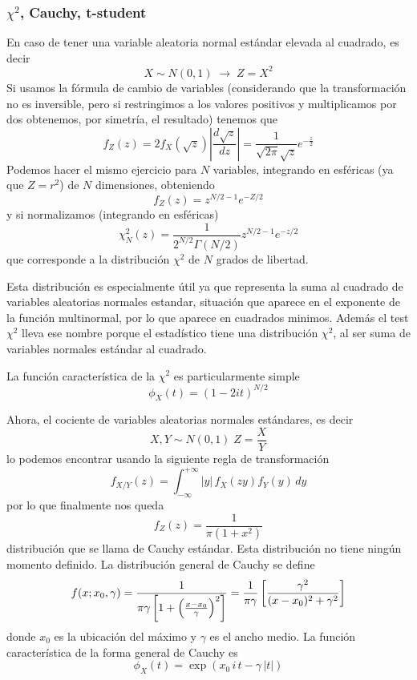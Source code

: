 \documentclass{article}
\numberwithin{equation}{section} %
\begin{document}
\subsubsection{$\chi^2$, Cauchy, t-student}
En caso de tener una variable aleatoria normal estándar elevada al cuadrado, es decir
\[ X \sim N(0,1) \; \rightarrow \; Z = X^2 \]
Si usamos la fórmula de cambio de variables (considerando que la transformación no es inversible, pero si restringimos a los valores positivos y multiplicamos por dos obtenemos, por simetría, el resultado) tenemos que
\[f_Z(z) = 2 f_X(\sqrt{z}) \left|\frac{d \sqrt{z}}{d z}\right| = \frac{1}{\sqrt{2\pi}\sqrt{z}} e^{-\frac{z}{2}}\]
Podemos hacer el mismo ejercicio para $N$ variables, integrando en esféricas (ya que $Z = r^2$) de $N$ dimensiones, obteniendo
\[f_Z(z) = z^{N/2 - 1} e^{-Z/2} \]
y si normalizamos (integrando en esféricas)
\begin{equation}
\chi^2_{N}(z) = \frac{1}{2^{N/2} \Gamma(N/2)} z^{N/2 - 1} e^{-z/2}
\end{equation}
que corresponde a la distribución $\chi^2$ de $N$ grados de libertad.

Esta distribución es especialmente útil ya que representa la suma al cuadrado de variables aleatorias normales estandar, situación que aparece en el exponente de la función multinormal, por lo que aparece en cuadrados minimos. Además el test $\chi^2$ lleva ese nombre porque el estadístico tiene una distribución $\chi^2$, al ser suma de variables normales estándar al cuadrado. 

La función característica de la $\chi^2$ es particularmente simple
\begin{equation}
\phi_{X}(t) = (1 - 2 i t)^{N/2}
\end{equation}

Ahora, el cociente de variables aleatorias normales estándares, es decir
\begin{equation}
X, Y \sim N(0, 1) \; Z = \frac{X}{Y}
\end{equation}
lo podemos encontrar usando la siguiente regla de transformación
\begin{equation}
f_{X/Y}(z) = \int^{+\infty}_{-\infty} |y|\, f_{X}(zy) f_Y(y) \, dy
\end{equation}
por lo que finalmente nos queda
\begin{equation}
f_Z(z) = \frac{1}{\pi (1 + x^2)}
\end{equation}
distribución que se llama de Cauchy estándar. Esta distribución no tiene ningún momento definido. La distribución general de Cauchy se define
\begin{equation}
f(x; x_0,\gamma) = \frac{1}{\pi\gamma \left[1 + \left(\frac{x - x_0}{\gamma}\right)^2\right]} = { 1 \over \pi \gamma } \left[ { \gamma^2 \over (x - x_0)^2 + \gamma^2  } \right]
\end{equation}
donde $x_0$ es la ubicación del máximo y $\gamma$ es el ancho medio. La función característica de la forma general de Cauchy es
\begin{equation}
\phi_{X}(t) = \exp(x_0\,i\,t-\gamma\,|t|)
\end{equation}
\end{document}

